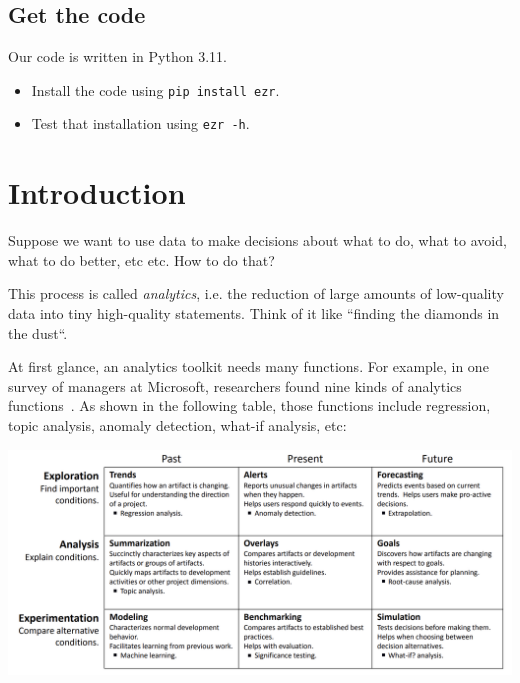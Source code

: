 \documentclass[landscape,	DIV=calc,%
							paper=letter,%
							fontsize=10pt,%
							twocolumn]{scrartcl}	 					%
\newcommand{\VERSION}{3.11}
\begin{document}
\subsection*{Get the code}
Our code is written in Python {\VERSION}.
\begin{itemize}
    \item
        Install the code using \verb+pip install ezr+. 
    \item
        Test that installation using \verb+ezr -h+.
\end{itemize}


\clearpage
\tableofcontents
\clearpage


\clearpage \section{Introduction}

Suppose we want to use data to make decisions about what to do,
what to avoid, what to do better, etc etc. How to do that?

This process is called {\em analytics}, i.e. the reduction of large
amounts of low-quality data into tiny high-quality statements. Think of it like
``finding the diamonds in the dust``. 

At first glance, an analytics toolkit needs many functions.   For example,
in one survey of managers at   Microsoft, 
researchers found nine kinds  of analytics functions~\cite{buse2012information}.
As shown in the following table, those  functions include regression, topic analysis, anomaly detection, what-if analysis,
etc:


\includegraphics[width=\linewidth]{Buse.png} 
\end{document}
